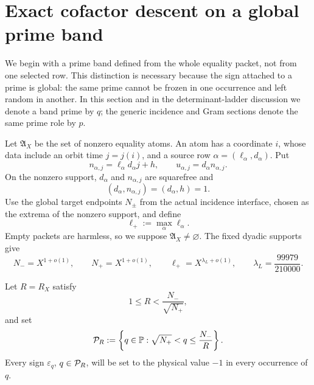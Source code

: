 \section{Exact cofactor descent on a global prime band}
\label{sec:tpc45-cofactor-descent}

We begin with a prime band defined from the whole equality packet, not
from one selected row.  This distinction is necessary because the sign
attached to a prime is global: the same prime cannot be frozen in one
occurrence and left random in another.
In this section and in the determinant-ladder discussion we denote a
band prime by \(q\); the generic incidence and Gram sections denote the
same prime role by \(p\).

Let \(\mathfrak A_X\) be the set of nonzero equality atoms.  An atom
has a coordinate \(i\), whose data include an orbit time \(j=j(i)\),
and a source row
\(\alpha=(\ell_\alpha,d_\alpha)\).  Put
\begin{equation}
 n_{\alpha,j}=\ell_\alpha d_\alpha j+h,
 \qquad
 u_{\alpha,j}=d_\alpha n_{\alpha,j}.
 \label{eq:tpc45-n-u}
\end{equation}
On the nonzero support, \(d_\alpha\) and \(n_{\alpha,j}\) are
squarefree and
\begin{equation}
 (d_\alpha,n_{\alpha,j})=(d_\alpha,h)=1.
 \label{eq:tpc45-source-target-coprime}
\end{equation}
Use the global target endpoints \(N_\pm\) from the actual incidence
interface, chosen as the extrema of the nonzero support, and define
\begin{equation}
 \ell_+:=\max_\alpha\ell_\alpha.
 \label{eq:tpc45-support-extrema}
\end{equation}
Empty packets are harmless, so we suppose \(\mathfrak A_X\ne\varnothing\).
The fixed dyadic supports give
\begin{equation}
 N_-=X^{1+o(1)},
 \qquad N_+=X^{1+o(1)},
 \qquad
 \ell_+=X^{\lambda_L+o(1)},
 \qquad
 \lambda_L=\frac{99979}{210000}.
 \label{eq:tpc45-extremal-scales}
\end{equation}

\begin{definition}
\label{def:tpc45-global-cofactor-band}
Let \(R=R_X\) satisfy
\begin{equation}
 1\le R<\frac{N_-}{\sqrt{N_+}},
 \label{eq:tpc45-R-range}
\end{equation}
and set
\begin{equation}
 \mathcal P_R:=
 \left\{q\in\mathbb P:
  \sqrt{N_+}<q\le \frac{N_-}{R}
 \right\}.
 \label{eq:tpc45-global-cofactor-band}
\end{equation}
Every sign \(\varepsilon_q\), \(q\in\mathcal P_R\), will be set to
the physical value \(-1\) in every occurrence of \(q\).
\end{definition}

